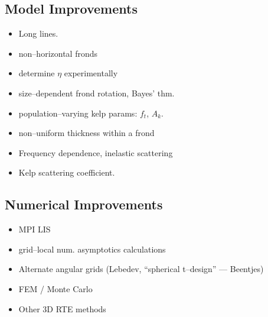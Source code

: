 \subsection{Model Improvements}
% 
% 
\begin{itemize}
  \item Long lines.
  \item non--horizontal fronds
  \item determine $\eta$ experimentally
  \item size--dependent frond rotation, Bayes' thm.
  \item population--varying kelp params: $f_t$, $A_k$.
  \item non--uniform thickness within a frond
  \item Frequency dependence, inelastic scattering
  \item Kelp scattering coefficient.
\end{itemize}

\subsection{Numerical Improvements}
\begin{itemize}
  \item MPI LIS
  \item grid--local num. asymptotics calculations
  \item Alternate angular grids (Lebedev, ``spherical t--design'' --- Beentjes)
  \item FEM / Monte Carlo
  \item Other 3D RTE methods
\end{itemize}

